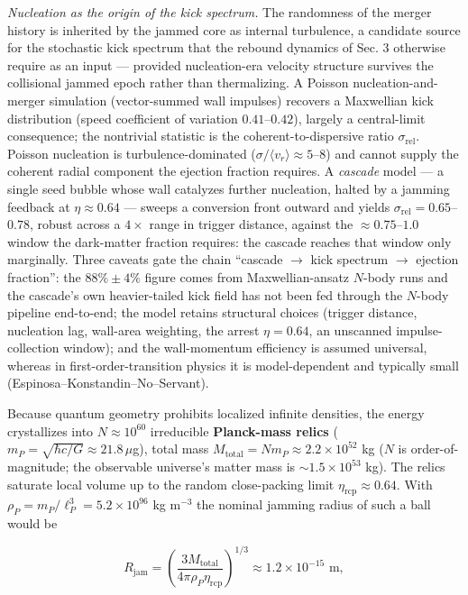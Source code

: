\documentclass[
]{article}
\begin{document}
\emph{Nucleation as the origin of the kick spectrum.} The randomness of
the merger history is inherited by the jammed core as internal
turbulence, a candidate source for the stochastic kick spectrum that the
rebound dynamics of Sec. 3 otherwise require as an input --- provided
nucleation-era velocity structure survives the collisional jammed epoch
rather than thermalizing. A Poisson nucleation-and-merger simulation
(vector-summed wall impulses) recovers a Maxwellian kick distribution
(speed coefficient of variation \(0.41\)--\(0.42\)), largely a
central-limit consequence; the nontrivial statistic is the
coherent-to-dispersive ratio \(\sigma_{\text{rel}}\). Poisson nucleation
is turbulence-dominated (\(\sigma/\langle v_r\rangle \approx 5\)--\(8\))
and cannot supply the coherent radial component the ejection fraction
requires. A \emph{cascade} model --- a single seed bubble whose wall
catalyzes further nucleation, halted by a jamming feedback at
\(\eta \approx 0.64\) --- sweeps a conversion front outward and yields
\(\sigma_{\text{rel}} = 0.65\)--\(0.78\), robust across a \(4\times\)
range in trigger distance, against the \(\approx 0.75\)--\(1.0\) window
the dark-matter fraction requires: the cascade reaches that window only
marginally. Three caveats gate the chain ``cascade \(\to\) kick spectrum
\(\to\) ejection fraction'': the \(88\% \pm 4\%\) figure comes from
Maxwellian-ansatz \(N\)-body runs and the cascade's own heavier-tailed
kick field has not been fed through the \(N\)-body pipeline end-to-end;
the model retains structural choices (trigger distance, nucleation lag,
wall-area weighting, the arrest \(\eta = 0.64\), an unscanned
impulse-collection window); and the wall-momentum efficiency is assumed
universal, whereas in first-order-transition physics it is
model-dependent and typically small (Espinosa--Konstandin--No--Servant).

Because quantum geometry prohibits localized infinite densities, the
energy crystallizes into \(N \approx 10^{60}\) irreducible
\textbf{Planck-mass relics}
(\(m_P = \sqrt{\hbar c/G} \approx 21.8\,\mu\)g), total mass
\(M_{\text{total}} = N m_P \approx 2.2\times10^{52}\) kg (\(N\) is
order-of-magnitude; the observable universe's matter mass is
\(\sim\!1.5\times10^{53}\) kg). The relics saturate local volume up to
the random close-packing limit \(\eta_{\text{rcp}} \approx 0.64\). With
\(\rho_P = m_P/\ell_P^3 = 5.2\times10^{96}\) kg m\(^{-3}\) the nominal
jamming radius of such a ball would be

\[R_{\text{jam}} = \left( \frac{3 M_{\text{total}}}{4 \pi \rho_P \eta_{\text{rcp}}} \right)^{1/3} \approx 1.2 \times 10^{-15} \text{ m},\]
\end{document}

